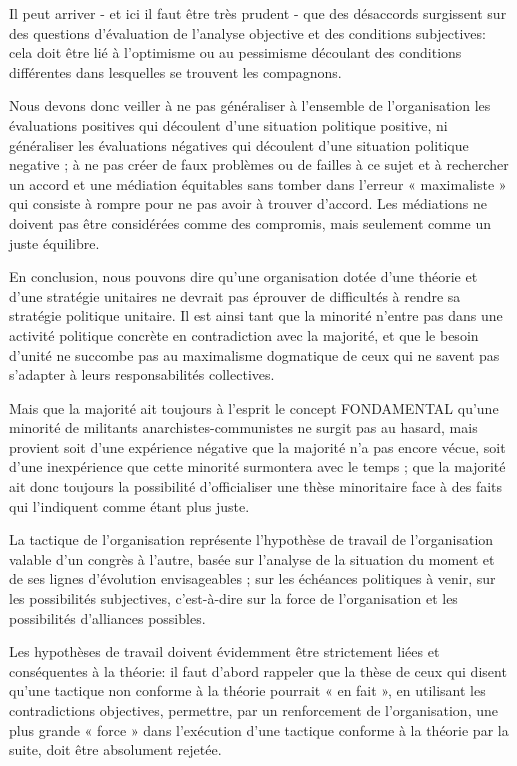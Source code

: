 Il peut arriver - et ici il faut être très prudent - que des désaccords surgissent sur des questions d'évaluation de l'analyse objective et des conditions subjectives: cela doit être lié à l’optimisme ou au pessimisme découlant des conditions différentes dans lesquelles se trouvent les compagnons.

Nous devons donc veiller à ne pas généraliser à l'ensemble de l'organisation les évaluations positives qui découlent d'une situation politique positive, ni généraliser les évaluations négatives qui découlent d'une situation politique negative ; à ne pas créer de faux problèmes ou de failles à ce sujet et à rechercher un accord et une médiation équitables sans tomber dans l'erreur « maximaliste » qui consiste à rompre pour ne pas avoir à trouver d’accord. Les médiations ne doivent pas être considérées comme des compromis, mais seulement comme un juste équilibre.

En conclusion, nous pouvons dire qu'une organisation dotée d'une théorie et d'une stratégie unitaires ne devrait pas éprouver de difficultés à rendre sa stratégie politique unitaire. Il est ainsi tant que la minorité n'entre pas dans une activité politique concrète en contradiction avec la majorité, et que le besoin d'unité ne succombe pas au maximalisme dogmatique de ceux qui ne savent pas s'adapter à leurs responsabilités collectives.

Mais que la majorité ait toujours à l'esprit le concept FONDAMENTAL qu'une minorité de militants anarchistes-communistes ne surgit pas au hasard, mais provient soit d'une expérience négative que la majorité n'a pas encore vécue, soit d'une inexpérience que cette minorité surmontera avec le temps ; que la majorité ait donc toujours la possibilité d'officialiser une thèse minoritaire face à des faits qui l'indiquent comme étant plus juste.

La tactique de l'organisation représente l'hypothèse de travail de l'organisation valable d'un congrès à l'autre, basée sur l'analyse de la situation du moment et de ses lignes d'évolution envisageables ; sur les échéances politiques à venir, sur les possibilités subjectives, c'est-à-dire sur la force de l'organisation et les possibilités d'alliances possibles.

Les hypothèses de travail doivent évidemment être strictement liées et conséquentes à la théorie: il faut d'abord rappeler que la thèse de ceux qui disent qu'une tactique non conforme à la théorie pourrait « en fait », en utilisant les contradictions objectives, permettre, par un renforcement de l'organisation, une plus grande « force » dans l'exécution d'une tactique conforme à la théorie par la suite, doit être absolument rejetée.

